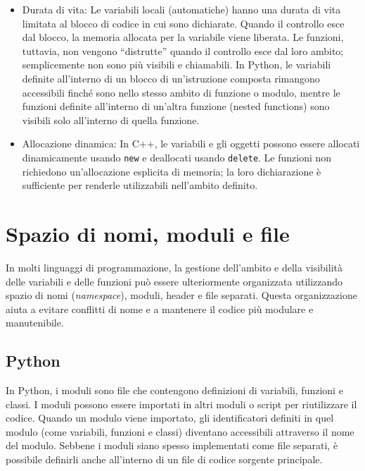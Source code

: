 \documentclass[
  letterpaper,
]{scrbook}
\begin{document}
\begin{itemize}
\item
  Durata di vita: Le variabili locali (automatiche) hanno una durata di
  vita limitata al blocco di codice in cui sono dichiarate. Quando il
  controllo esce dal blocco, la memoria allocata per la variabile viene
  liberata. Le funzioni, tuttavia, non vengono ``distrutte'' quando il
  controllo esce dal loro ambito; semplicemente non sono più visibili e
  chiamabili. In Python, le variabili definite all'interno di un blocco
  di un'istruzione composta rimangono accessibili finché sono nello
  stesso ambito di funzione o modulo, mentre le funzioni definite
  all'interno di un'altra funzione (nested functions) sono visibili solo
  all'interno di quella funzione.
\item
  Allocazione dinamica: In C++, le variabili e gli oggetti possono
  essere allocati dinamicamente usando \texttt{new} e deallocati usando
  \texttt{delete}. Le funzioni non richiedono un'allocazione esplicita
  di memoria; la loro dichiarazione è sufficiente per renderle
  utilizzabili nell'ambito definito.
\end{itemize}

\section{Spazio di nomi, moduli e
file}\label{spazio-di-nomi-moduli-e-file}

In molti linguaggi di programmazione, la gestione dell'ambito e della
visibilità delle variabili e delle funzioni può essere ulteriormente
organizzata utilizzando spazio di nomi (\emph{namespace}), moduli,
header e file separati. Questa organizzazione aiuta a evitare conflitti
di nome e a mantenere il codice più modulare e manutenibile.

\subsection{Python}\label{python}

In Python, i moduli sono file che contengono definizioni di variabili,
funzioni e classi. I moduli possono essere importati in altri moduli o
script per riutilizzare il codice. Quando un modulo viene importato, gli
identificatori definiti in quel modulo (come variabili, funzioni e
classi) diventano accessibili attraverso il nome del modulo. Sebbene i
moduli siano spesso implementati come file separati, è possibile
definirli anche all'interno di un file di codice sorgente principale.
\end{document}
